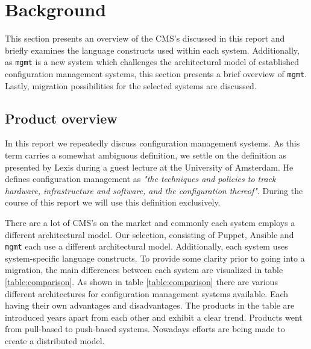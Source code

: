 \section{Background}\label{sec:background}
This section presents an overview of the CMS's discussed in this report and briefly examines the language constructs used within each system. Additionally, as \texttt{mgmt} is a new system which challenges the architectural model of established configuration management systems, this section presents a brief overview of \texttt{mgmt}. Lastly, migration possibilities for the selected systems are discussed.

\subsection{Product overview}
In this report we repeatedly discuss configuration management systems. As this term carries a somewhat ambiguous definition, we settle on the definition as presented by Lexis \cite{lexis_2016} during a guest lecture at the University of Amsterdam. He defines configuration management as \textit{"the techniques and policies to track hardware, infrastructure and software, and the configuration thereof"}. During the course of this report we will use this definition exclusively.

There are a lot of CMS's on the market and commonly each system employs a different architectural model. Our selection, consisting of Puppet, Ansible and \texttt{mgmt} each use a different architectural model. Additionally, each system uses system-specific language constructs. To provide some clarity prior to going into a migration, the main differences between each system are visualized in table \ref{table:comparison}. As shown in table \ref{table:comparison} there are various different architectures for configuration management systems available. Each having their own advantages and disadvantages. The products in the table are introduced years apart from each other and exhibit a clear trend. Products went from pull-based to push-based systems. Nowadays efforts are being made to create a distributed model.

